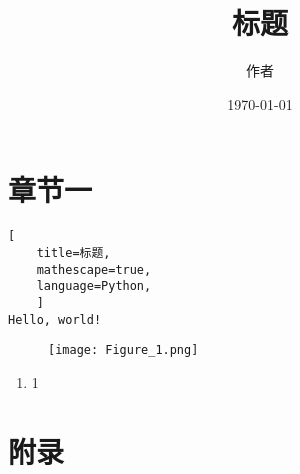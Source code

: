 \documentclass[UTF8]{ctexart}
\title{标题}
\author{作者}
\date{\today}
\begin{document}
\maketitle

\newpage

\tableofcontents

\newpage

\section{章节一}

\begin{lstlisting}[
    title=标题,
    mathescape=true,
    language=Python,
    ]
Hello, world!
\end{lstlisting}

\begin{figure}[H]
    \centering
    \texttt{[image: Figure\_1.png]}
\end{figure}

\begin{enumerate}[
    label = (\arabic*),
    itemindent = 0pt,
    labelindent = \parindent,
    labelwidth = 2em,
    labelsep = 5pt,
    leftmargin = *]
    \item 1
\end{enumerate}

\newpage

\appendix

\section{附录}
\end{document}
